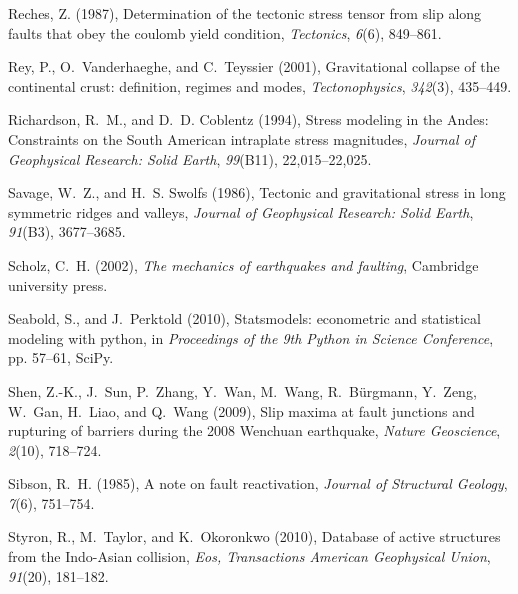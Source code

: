 \documentclass[twocolumn,jgrga]{AGUTeX}
\begin{document}
\begin{article}
{{\begin{thebibliography}{87}
Reches, Z. (1987), Determination of the tectonic stress tensor from slip along
  faults that obey the coulomb yield condition, \textit{Tectonics},
  \textit{6}(6), 849--861.

Rey, P., O.~Vanderhaeghe, and C.~Teyssier (2001), Gravitational collapse of the
  continental crust: definition, regimes and modes, \textit{Tectonophysics},
  \textit{342}(3), 435--449.

Richardson, R.~M., and D.~D. Coblentz (1994), Stress modeling in the {A}ndes:
  Constraints on the {S}outh {A}merican intraplate stress magnitudes,
  \textit{Journal of Geophysical Research: Solid Earth}, \textit{99}(B11),
  22,015--22,025.

Savage, W.~Z., and H.~S. Swolfs (1986), Tectonic and gravitational stress in
  long symmetric ridges and valleys, \textit{Journal of Geophysical Research:
  Solid Earth}, \textit{91}(B3), 3677--3685.

Scholz, C.~H. (2002), \textit{The mechanics of earthquakes and faulting},
  Cambridge university press.

Seabold, S., and J.~Perktold (2010), Statsmodels: econometric and statistical
  modeling with python, in \textit{Proceedings of the 9th Python in Science
  Conference}, pp. 57--61, SciPy.

Shen, Z.-K., J.~Sun, P.~Zhang, Y.~Wan, M.~Wang, R.~B{\"u}rgmann, Y.~Zeng,
  W.~Gan, H.~Liao, and Q.~Wang (2009), Slip maxima at fault junctions and
  rupturing of barriers during the 2008 {W}enchuan earthquake, \textit{Nature
  Geoscience}, \textit{2}(10), 718--724.

Sibson, R.~H. (1985), A note on fault reactivation, \textit{Journal of
  Structural Geology}, \textit{7}(6), 751--754.

Styron, R., M.~Taylor, and K.~Okoronkwo (2010), Database of active structures
  from the {I}ndo-{A}sian collision, \textit{Eos, Transactions American
  Geophysical Union}, \textit{91}(20), 181--182.


\end{thebibliography}}}
\end{article}
\end{document}
